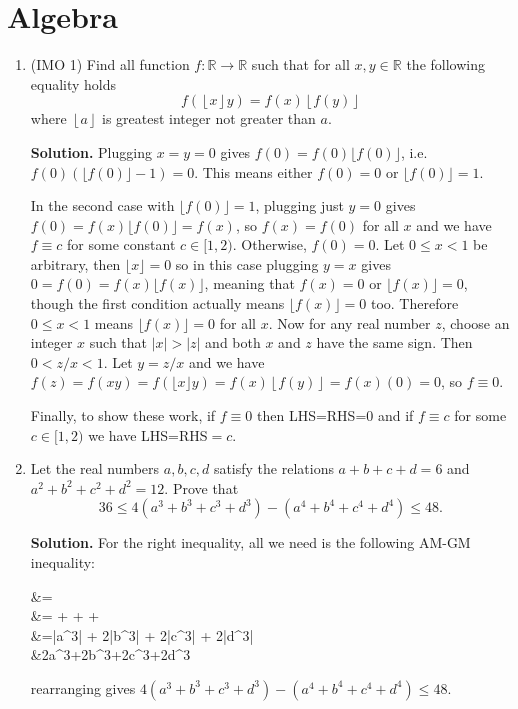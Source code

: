 \documentclass[12pt]{article}
\newcommand{\<}{\langle}
\renewcommand{\>}{\rangle}
\begin{document}
\section*{Algebra}
\begin{enumerate}
	\item [\textbf{A1}] (IMO 1) Find all function $f:\mathbb{R}\rightarrow\mathbb{R}$ such that for all $x,y\in\mathbb{R}$ the following equality holds \[
	f(\left\lfloor x\right\rfloor y)=f(x)\left\lfloor f(y)\right\rfloor \] where $\left\lfloor a\right\rfloor $ is greatest integer not greater than $a.$
	
	\textbf{Solution.} Plugging $x=y=0$ gives $f(0)=f(0)\lfloor f(0)\rfloor$, i.e. $f(0)(\lfloor f(0)\rfloor-1)=0$. 
	This means either $f(0)=0$ or $\lfloor f(0)\rfloor=1$. 
	
	In the second case with $\lfloor f(0)\rfloor=1$, plugging just $y=0$ gives $f(0)=f(x)\lfloor f(0)\rfloor=f(x)$, so $f(x)=f(0)$ for all $x$ and we have $f\equiv c$ for some constant $c\in [1, 2)$. Otherwise, $f(0)=0$. 
	Let $0\le x<1$ be arbitrary, then $\lfloor x\rfloor =0$ so in this case plugging $y=x$ gives $0=f(0)=f(x)\lfloor f(x)\rfloor $, meaning that 
	$f(x)=0$ or $\lfloor f(x)\rfloor =0$, though the first condition actually means $\lfloor f(x)\rfloor =0$ too. 
	Therefore $0\le x<1$ means $\lfloor f(x)\rfloor =0$ for all $x$. 
	Now for any real number $z$, choose an integer $x$ such that $|x|>|z|$ and both $x$ and $z$ have the same sign. Then $0<z/x<1$. Let $y=z/x$ and we have 
	$f(z)=f(xy)=f(\lfloor x\rfloor y)=f(x)\left\lfloor f(y)\right\rfloor =f(x)(0)=0$, so $f\equiv 0$. 
	
	Finally, to show these work, if $f\equiv 0$ then LHS=RHS=0 and if $f\equiv c$ for some $c\in [1, 2)$ we have LHS=RHS$=c$. 
	
	\item[\textbf{A2}] Let the real numbers $a,b,c,d$ satisfy the relations $a+b+c+d=6$ and $a^2+b^2+c^2+d^2=12.$ Prove that
	\[36 \leq 4 \left(a^3+b^3+c^3+d^3\right) - \left(a^4+b^4+c^4+d^4 \right) \leq 48.\]
	
	\textbf{Solution.} For the right inequality, all we need is the following AM-GM inequality: 
	\begin{flalign*}
	&=\\
	&=\ge {} +  + +\\
	&=|a^3| + 2|b^3| + 2|c^3| + 2|d^3|\\
	&\ge 2a^3+2b^3+2c^3+2d^3
	\end{flalign*}
	rearranging gives $4 \left(a^3+b^3+c^3+d^3\right) - \left(a^4+b^4+c^4+d^4 \right) \leq 48$. 
	

\end{enumerate}
\end{document}
